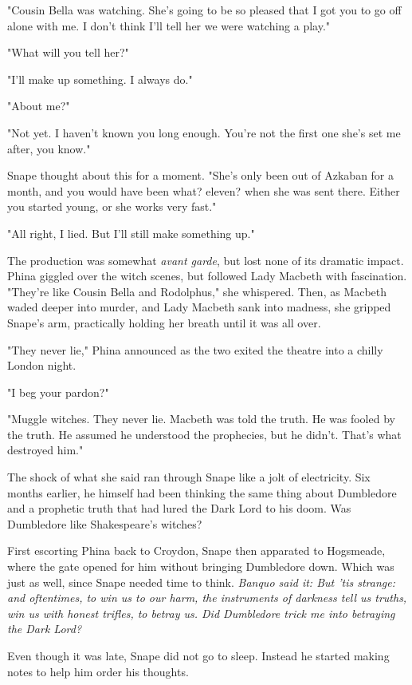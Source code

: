 "Cousin Bella was watching. She's going to be so pleased that I got you to go off alone with me. I don't think I'll tell her we were watching a play."

"What will you tell her?"

"I'll make up something. I always do."

"About me?"

"Not yet. I haven't known you long enough. You're not the first one she's set me after, you know."

Snape thought about this for a moment. "She's only been out of Azkaban for a month, and you would have been what? eleven? when she was sent there. Either you started young, or she works very fast."

"All right, I lied. But I'll still make something up."

The production was somewhat \emph{avant garde}, but lost none of its dramatic impact. Phina giggled over the witch scenes, but followed Lady Macbeth with fascination. "They're like Cousin Bella and Rodolphus," she whispered. Then, as Macbeth waded deeper into murder, and Lady Macbeth sank into madness, she gripped Snape's arm, practically holding her breath until it was all over.

"They never lie," Phina announced as the two exited the theatre into a chilly London night.

"I beg your pardon?"

"Muggle witches. They never lie. Macbeth was told the truth. He was fooled by the truth. He assumed he understood the prophecies, but he didn't. That's what destroyed him."

The shock of what she said ran through Snape like a jolt of electricity. Six months earlier, he himself had been thinking the same thing about Dumbledore and a prophetic truth that had lured the Dark Lord to his doom. Was Dumbledore like Shakespeare's witches?

First escorting Phina back to Croydon, Snape then apparated to Hogsmeade, where the gate opened for him without bringing Dumbledore down. Which was just as well, since Snape needed time to think. \emph{Banquo said it: But 'tis strange: and oftentimes, to win us to our harm, the instruments of darkness tell us truths, win us with honest trifles, to betray us. Did Dumbledore trick me into betraying the Dark Lord?}

Even though it was late, Snape did not go to sleep. Instead he started making notes to help him order his thoughts.

